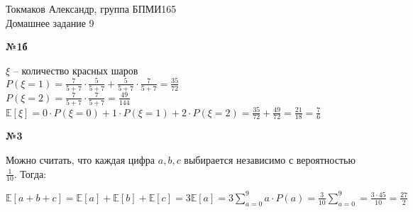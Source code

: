 \documentclass{article}
\newcommand{\E}[1]{\mathbb{E}[ #1 ]}
\newenvironment{task}{\begin{center}\fontsize{14}{14}\selectfont\bf}{\rm\fontsize{12}{12}\selectfont\end{center}}
\begin{document}
	\begin{center}
		Токмаков Александр, группа БПМИ165 \\
		Домашнее задание 9
	\end{center}
	
	\begin{task} 
		№1б
	\end{task}
	\begin{center}
		$\xi$ -- количество красных шаров\\
		$P(\xi = 1) = \frac{7}{5+7}\cdot\frac{5}{5+7} + \frac{5}{5+7}\cdot\frac{7}{5+7} = \frac{35}{72}$\\
		$P(\xi = 2) = \frac{7}{5+7}\cdot\frac{7}{5+7} = \frac{49}{144}$\\
		$\E{\xi} = 0\cdot P(\xi=0) + 1\cdot P(\xi=1) + 2\cdot P(\xi=2) = \frac{35}{72} + \frac{49}{72} = \frac{21}{18} = \frac{7}{6}$
	\end{center}
	
	
		\begin{task} 
		№3
	\end{task}
	Можно считать, что каждая цифра $a, b, c$ выбирается независимо с вероятностью $\frac{1}{10}$. Тогда:
	\begin{center}
		$\E{a + b + c} = \E{a} + \E{b} + \E{c} = 3\E{a} = 3\sum\limits_{a = 0}^{9} a\cdot P(a) = \frac{3}{10}\sum\limits_{a = 0}^{9} = \frac{3\cdot 45}{10} = \frac{27}{2}$\\
	\end{center}
	
	
		
\end{document}
